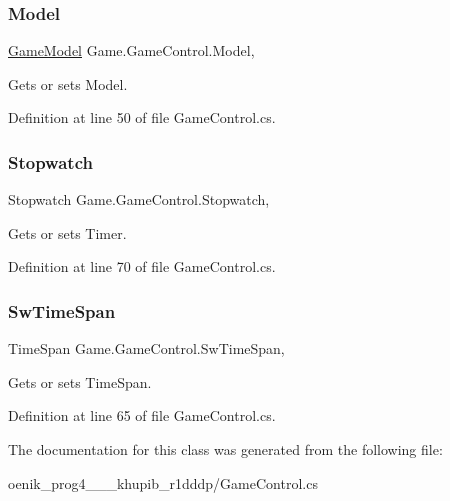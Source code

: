 \mbox{\label{class_game_1_1_game_control_a683d4e349dda0c72daecad645ea62542}} 
\subsubsection{\texorpdfstring{Model}{Model}}
{\footnotesize\ttfamily \mbox{\hyperlink{class_game_1_1_game_model}{Game\+Model}} Game.\+Game\+Control.\+Model\hspace{0.3cm}{\ttfamily [get]}, {\ttfamily [set]}}



Gets or sets Model. 



Definition at line 50 of file Game\+Control.\+cs.

\mbox{\label{class_game_1_1_game_control_a15720f8462319c368cb51320535f5512}} 
\subsubsection{\texorpdfstring{Stopwatch}{Stopwatch}}
{\footnotesize\ttfamily Stopwatch Game.\+Game\+Control.\+Stopwatch\hspace{0.3cm}{\ttfamily [get]}, {\ttfamily [set]}}



Gets or sets Timer. 



Definition at line 70 of file Game\+Control.\+cs.

\mbox{\label{class_game_1_1_game_control_ac0c79f7cae61e583a25c7d4436905b3f}} 
\subsubsection{\texorpdfstring{SwTimeSpan}{SwTimeSpan}}
{\footnotesize\ttfamily Time\+Span Game.\+Game\+Control.\+Sw\+Time\+Span\hspace{0.3cm}{\ttfamily [get]}, {\ttfamily [set]}}



Gets or sets Time\+Span. 



Definition at line 65 of file Game\+Control.\+cs.



The documentation for this class was generated from the following file\+:\begin{DoxyCompactItemize}
\item 
oenik\+\_\+prog4\+\_\+\_\+\_\+khupib\+\_\+r1dddp/Game\+Control.\+cs\end{DoxyCompactItemize}
